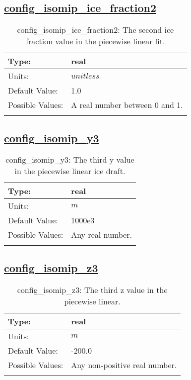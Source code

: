 \subsection[config\_isomip\_ice\_fraction2]{\hyperref[sec:nm_tab_isomip]{config\_isomip\_ice\_fraction2}}
\label{subsec:nm_sec_config_isomip_ice_fraction2}
\begin{center}
\begin{longtable}{| p{2.0in} || p{4.0in} |}
    \hline
    Type: & real \\
    \hline
    Units: & $unitless$ \\
    \hline
    Default Value: & 1.0 \\
    \hline
    Possible Values: & A real number between 0 and 1. \\
    \hline
    \caption{config\_isomip\_ice\_fraction2: The second ice fraction value in the piecewise linear fit.}
\end{longtable}
\end{center}
\subsection[config\_isomip\_y3]{\hyperref[sec:nm_tab_isomip]{config\_isomip\_y3}}
\label{subsec:nm_sec_config_isomip_y3}
\begin{center}
\begin{longtable}{| p{2.0in} || p{4.0in} |}
    \hline
    Type: & real \\
    \hline
    Units: & $m$ \\
    \hline
    Default Value: & 1000e3 \\
    \hline
    Possible Values: & Any real number. \\
    \hline
    \caption{config\_isomip\_y3: The third y value in the piecewise linear ice draft.}
\end{longtable}
\end{center}
\subsection[config\_isomip\_z3]{\hyperref[sec:nm_tab_isomip]{config\_isomip\_z3}}
\label{subsec:nm_sec_config_isomip_z3}
\begin{center}
\begin{longtable}{| p{2.0in} || p{4.0in} |}
    \hline
    Type: & real \\
    \hline
    Units: & $m$ \\
    \hline
    Default Value: & -200.0 \\
    \hline
    Possible Values: & Any non-positive real number. \\
    \hline
    \caption{config\_isomip\_z3: The third z value in the piecewise linear.}
\end{longtable}
\end{center}
